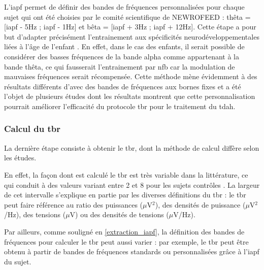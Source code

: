 L'\gls{iapf} permet de définir des bandes de fréquences personnalisées pour chaque sujet qui ont été choisies 
par le comité scientifique de NEWROFEED : thêta = [\gls{iapf} - 5Hz ; \gls{iapf} - 1Hz] et bêta = [\gls{iapf} + 3Hz ; \gls{iapf} + 12Hz].
Cette étape a pour but d'adapter précisément l'entrainement aux spécificités neurodéveloppementales liées à l'âge de l'enfant \citep{Aurlien2004}. En effet, dans le cas des enfants, 
il serait possible de considérer 
des basses fréquences de la bande alpha comme appartenant à la bande thêta, ce qui fausserait l'entrainement par \gls{nfb} car la modulation de mauvaises fréquences 
serait récompensée. Cette méthode mène évidemment à des résultats différents d'avec des bandes de fréquences aux bornes fixes \citep{Arns2008, Vollebregt2015} et a été 
l'objet de plusieurs études \citep{Kaiser2001, Bazanova2006, Vollebregt2015} dont les résultats montrent que cette personnalisation pourrait améliorer l'efficacité du protocole
\gls{tbr} pour le traitement du \gls{tdah}.

\subsubsection{Calcul du \gls{tbr}} \label{tbr_computation}
La dernière étape consiste à obtenir le \gls{tbr}, dont la méthode de calcul diffère selon les études.

En effet, la façon dont est calculé le \gls{tbr} est très variable dans la littérature, ce qui conduit à des valeurs variant entre 2 et 8 pour les sujets contrôles \citep{Arns2012,
Schutte2017}. La largeur de cet intervalle s'explique en partie par les diverses définitions du \gls{tbr} : le \gls{tbr} peut faire référence au ratio
des puissances ($\mu$V$^2$), des densités de puissance ($\mu$V$^2$/Hz), des tensions ($\mu$V) ou des densités de tensions ($\mu$V/Hz).  

Par ailleurs, comme souligné en \ref{extraction_iapf}, la définition des bandes de fréquences pour calculer le \gls{tbr} peut aussi varier : par exemple, le \gls{tbr} peut être obtenu à partir
de bandes de fréquences standards ou personnalisées grâce à l'\gls{iapf} du sujet. 

